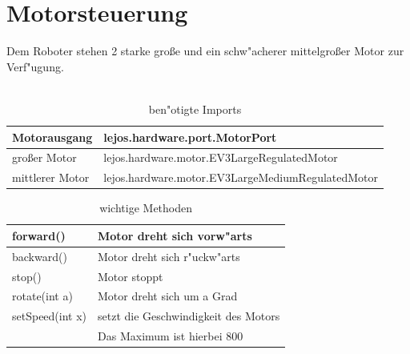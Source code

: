 \section{Motorsteuerung}
	Dem Roboter stehen 2 starke gro\ss{}e und ein schw"acherer mittelgro\ss{}er Motor zur Verf"ugung.\\ \\
	\begin{figure}[h]
		\begin{floatrow}
		\end{floatrow}
	\end{figure}

	
	
	\begin{table}[h]
		\begin{tabular}{|p{}| p{}|}
			\hline
			Motorausgang & lejos.hardware.port.MotorPort\\ \hline
			gro\ss{}er Motor& lejos.hardware.motor.EV3LargeRegulatedMotor
			 \\ \hline mittlerer Motor & lejos.hardware.motor.EV3LargeMediumRegulatedMotor\\ \hline 
		\end{tabular}
		\caption{ben"otigte Imports}
	\end{table}
 
	\begin{table}[H]
		\begin{tabular}{|p{}| p{}|}
			\hline
			forward()& Motor dreht sich vorw"arts \\ \hline 
			backward() &  Motor dreht sich r"uckw"arts\\ \hline 
			stop() & Motor stoppt\\ \hline
			rotate(int a) & Motor dreht sich um a Grad\\ \hline
			setSpeed(int x) & setzt die Geschwindigkeit des Motors \\
			& Das Maximum ist hierbei 800\\ \hline
		\end{tabular}
		\caption{wichtige Methoden}
	\end{table}

